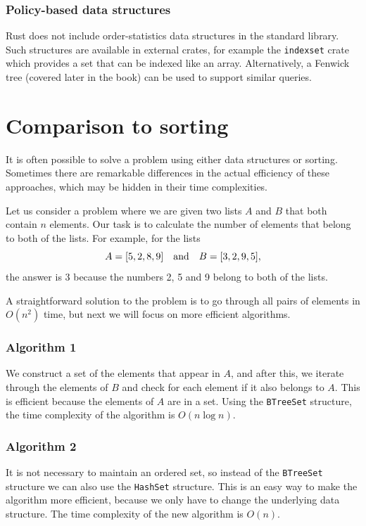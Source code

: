 \subsubsection{Policy-based data structures}

Rust does not include order-statistics
data structures in the standard library.
Such structures are available in external
crates, for example the \texttt{indexset} crate
which provides a set that can be indexed like an array.
Alternatively, a Fenwick tree (covered later in the book)
can be used to support similar queries.

\section{Comparison to sorting}

It is often possible to solve a problem
using either data structures or sorting.
Sometimes there are remarkable differences
in the actual efficiency of these approaches,
which may be hidden in their time complexities.

Let us consider a problem where
we are given two lists $A$ and $B$
that both contain $n$ elements.
Our task is to calculate the number of elements
that belong to both of the lists.
For example, for the lists
\[A = [5,2,8,9] \hspace{10px} \textrm{and} \hspace{10px} B = [3,2,9,5],\]
the answer is 3 because the numbers 2, 5
and 9 belong to both of the lists.

A straightforward solution to the problem is
to go through all pairs of elements in $O(n^2)$ time,
but next we will focus on
more efficient algorithms.

\subsubsection{Algorithm 1}

We construct a set of the elements that appear in $A$,
and after this, we iterate through the elements
of $B$ and check for each element if it
also belongs to $A$.
This is efficient because the elements of $A$
are in a set.
Using the \texttt{BTreeSet} structure,
the time complexity of the algorithm is $O(n \log n)$.

\subsubsection{Algorithm 2}

It is not necessary to maintain an ordered set,
so instead of the \texttt{BTreeSet} structure
we can also use the \texttt{HashSet} structure.
This is an easy way to make the algorithm
more efficient, because we only have to change
the underlying data structure.
The time complexity of the new algorithm is $O(n)$.

